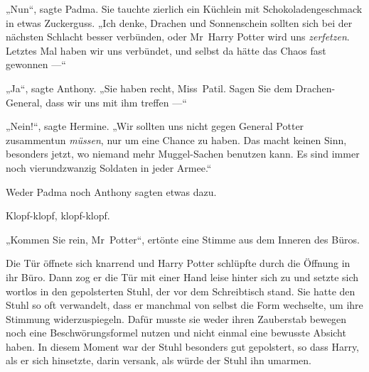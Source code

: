 „Nun“, sagte Padma. Sie tauchte zierlich ein Küchlein mit Schokoladengeschmack in etwas Zuckerguss.
„Ich denke, Drachen und Sonnenschein sollten sich bei der nächsten Schlacht besser verbünden, oder Mr~Harry Potter wird uns \emph{zerfetzen}. Letztes Mal haben wir uns verbündet, und selbst da hätte das Chaos fast gewonnen —“

„Ja“, sagte Anthony.
„Sie haben recht, Miss~Patil. Sagen Sie dem Drachen-General, dass wir uns mit ihm treffen —“

„Nein!“, sagte Hermine.
„Wir sollten uns nicht gegen General Potter zusammentun \emph{müssen}, nur um eine Chance zu haben. Das macht keinen Sinn, besonders jetzt, wo niemand mehr Muggel-Sachen benutzen kann. Es sind immer noch vierundzwanzig Soldaten in jeder Armee.“

Weder Padma noch Anthony sagten etwas dazu.

\later

Klopf-klopf, klopf-klopf.

„Kommen Sie rein, Mr~Potter“, ertönte eine Stimme aus dem Inneren des Büros.

Die Tür öffnete sich knarrend und Harry Potter schlüpfte durch die Öffnung in ihr Büro. Dann zog er die Tür mit einer Hand leise hinter sich zu und setzte sich wortlos in den gepolsterten Stuhl, der vor dem Schreibtisch stand. Sie hatte den Stuhl so oft verwandelt, dass er manchmal von selbst die Form wechselte, um ihre Stimmung widerzuspiegeln. Dafür musste sie weder ihren Zauberstab bewegen noch eine Beschwörungsformel nutzen und nicht einmal eine bewusste Absicht haben. In diesem Moment war der Stuhl besonders gut gepolstert, so dass Harry, als er sich hinsetzte, darin versank, als würde der Stuhl ihn umarmen.

